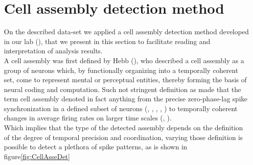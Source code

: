 \section{Cell assembly detection method}
\label{chap:AssemblyMethod}
On the described data-set we applied a cell assembly detection method developed in our lab (\cite{RussoDurstewitz}), that we present in this section to facilitate reading and interpretation of analysis results.\\
A cell assembly was first defined by Hebb (\cite{Hebb}), who described a cell assembly as a group of neurons which, by functionally organizing into a temporally coherent set, come to represent mental or perceptual entities, thereby forming the basis of neural coding and computation. Such not stringent definition as made that the term cell assembly denoted in fact anything from the precise zero-phase-lag spike synchronization in a defined subset of neurons (\cite{Abeles}, \cite{Singer}, \cite{Roelfsema}, \cite{Diesmann}, \cite{Harris2003}) to temporally coherent changes in average firing rates on larger time scales (\cite{Goldman}, \cite{Durstewitz}).\\Which implies that the type of the detected assembly depends on the definition of the degree of temporal precision and coordination, varying those definition is possible to detect a plethora of spike patterns, as is shown in figure\ref{fig:CellAsseDet} \\
